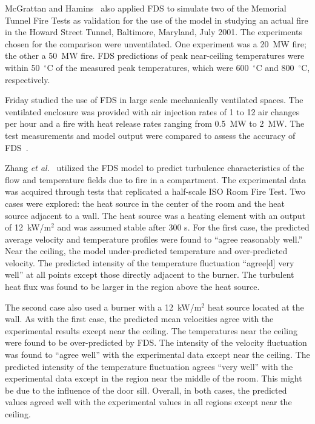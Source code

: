 McGrattan and Hamins~\cite{McGrattan:HST} also applied FDS to simulate two of the Memorial Tunnel Fire Tests as validation for the use of the model
in  studying  an  actual  fire in  the  Howard  Street  Tunnel, Baltimore,  Maryland,  July  2001.  The  experiments  chosen  for  the comparison
were unventilated. One  experiment was  a 20~MW  fire; the other a 50~MW fire.  FDS predictions of peak near-ceiling temperatures were within
50~$^\circ$C of the measured peak temperatures, which were 600~$^\circ$C and 800~$^\circ$C, respectively.

Friday studied the  use of FDS in large  scale mechanically ventilated spaces.   The ventilated  enclosure  was provided  with air  injection rates
of  1 to 12 air  changes per hour  and a fire with  heat release rates ranging  from 0.5~MW to  2~MW.  The test measurements  and model output were
compared to assess the accuracy of FDS~\cite{Friday:1}.

Zhang {\em  et al.}~\cite{Zhang:2} utilized  the FDS model  to predict turbulence characteristics  of the flow and temperature  fields due to fire
in a compartment.   The experimental  data was  acquired through tests that replicated a half-scale ISO Room Fire Test.  Two cases were explored:
the heat  source in  the center  of the  room and  the heat source adjacent to a wall.  The heat source was a heating element with an output of
12~kW/m$^2$ and was  assumed stable after 300 s.  For the first case,  the predicted  average velocity and  temperature profiles were found to
``agree reasonably  well.''  Near the ceiling, the model under-predicted   temperature   and   over-predicted  velocity.    The predicted  intensity
of  the temperature  fluctuation  ``agree[d] very well'' at  all points  except those directly  adjacent to  the burner. The turbulent heat flux was
found to be larger in the region above the heat source.

The  second case also  used a  burner with  a 12~kW/m$^2$  heat source located  at the  wall.  As  with the  first case,  the  predicted mean
velocities  agree  with  the  experimental  results  except  near  the ceiling.   The  temperatures  near   the  ceiling  were  found  to  be
over-predicted by FDS.  The  intensity of the velocity fluctuation was found to  ``agree well''  with the experimental  data except  near the
ceiling.   The  predicted  intensity  of the  temperature  fluctuation agrees ``very well''  with the experimental data except  in the region near
the  middle of the room.  This  might be due to  the influence of the door  sill.  Overall, in  both cases, the predicted  values agreed well  with
the  experimental values  in  all regions  except near  the ceiling.


